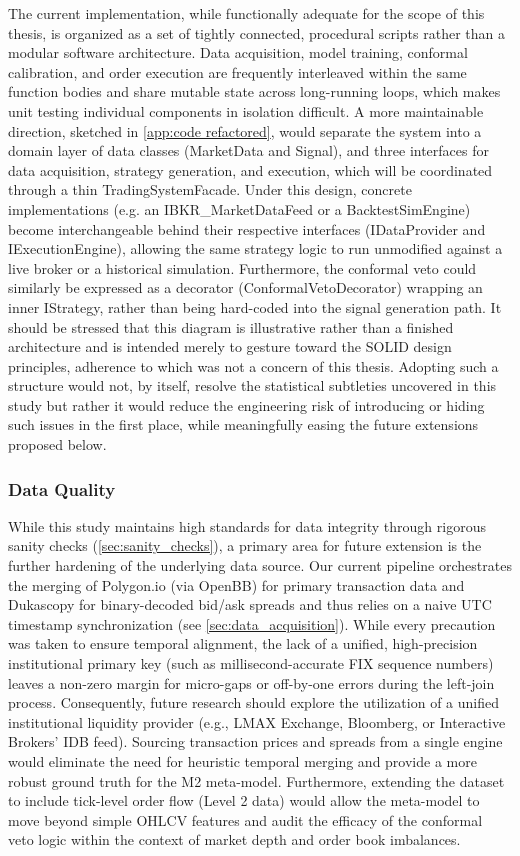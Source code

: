\documentclass[12pt, a4paper]{article}
\begin{document}
The current implementation, while functionally adequate for the scope of this thesis, is organized as a set of tightly connected, procedural scripts rather than a 
modular software architecture. Data acquisition, model training, conformal calibration, and order execution are frequently interleaved within the same function 
bodies and share mutable state across long-running loops, which makes unit testing individual components in isolation difficult. 
A more maintainable direction, sketched in \ref{app:code refactored}, would separate the system into a domain layer of data classes 
(MarketData and Signal), and three interfaces for data acquisition, strategy generation, and execution, which will be coordinated through a thin 
TradingSystemFacade. Under this design, concrete implementations (e.g. an IBKR\_MarketDataFeed or a BacktestSimEngine) become interchangeable behind their 
respective interfaces (IDataProvider and IExecutionEngine), allowing the same strategy logic to run unmodified against a live broker or a historical simulation. 
Furthermore, the conformal veto could similarly be expressed as a decorator (ConformalVetoDecorator) wrapping an inner IStrategy, rather than being hard-coded into 
the signal generation path. It should be stressed that this diagram is illustrative rather than a finished architecture and is intended merely to gesture toward the 
SOLID design principles, adherence to which was not a concern of this thesis. Adopting such a structure would not, by itself, resolve the statistical subtleties 
uncovered in this study but rather it would reduce the engineering risk of introducing or hiding such issues in the first place, while meaningfully easing the 
future extensions proposed below.


\subsubsection{Data Quality}

While this study maintains high standards for data integrity through rigorous sanity checks (\ref{sec:sanity_checks}), a primary area for future extension is the further hardening of the 
underlying data source. Our current pipeline orchestrates the merging of Polygon.io (via OpenBB) for primary transaction data and Dukascopy for binary-decoded bid/ask spreads
and thus relies on a naive UTC timestamp synchronization (see \ref{sec:data_acquisition}). While every precaution was taken to ensure temporal alignment, the lack of a unified,
high-precision institutional primary key (such as millisecond-accurate FIX sequence numbers) leaves a non-zero margin for micro-gaps or off-by-one errors during the left-join process.
Consequently, future research should explore the utilization of a unified institutional liquidity provider (e.g., LMAX Exchange, Bloomberg, or Interactive Brokers' IDB feed). 
Sourcing transaction prices and spreads from a single engine would eliminate the need for heuristic temporal merging and provide a more robust ground truth for the M2 meta-model. 
Furthermore, extending the dataset to include tick-level order flow (Level 2 data) would allow the meta-model to move beyond simple OHLCV features and audit the efficacy of the conformal 
veto logic within the context of market depth and order book imbalances.
\end{document}

